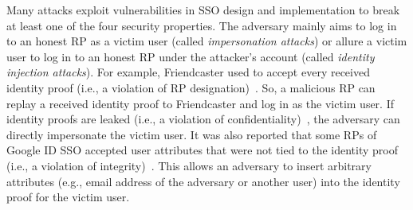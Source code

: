 Many attacks exploit vulnerabilities in SSO design and implementation to break at least one of the four security properties. %
The adversary mainly aims to log in to an honest RP as a victim user (called \emph{impersonation attacks}) or allure a victim user to log in to an honest RP under the attacker's account (called \emph{identity injection attacks}). For example, Friendcaster used to accept every received identity proof (i.e., a violation of RP designation)~\cite{ChenPCTKT14}. So, a malicious RP can replay a received identity proof to Friendcaster and log in as the victim user. If identity proofs are leaked (i.e., a violation of confidentiality)~\cite{WangCW12,ccsSunB12,ArmandoCCCPS13,DiscoveringJCS,dimvaLiM16}, the adversary can directly impersonate the victim user.
It was also reported that some RPs of Google ID SSO accepted user attributes that were not tied to the identity proof (i.e., a violation of integrity)~\cite{WangCW12}. This allows an adversary to insert arbitrary attributes (e.g., email address of the adversary or another user) into the identity proof for the victim user. %

